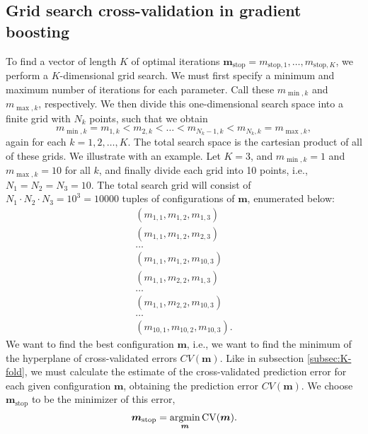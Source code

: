 \subsection{Grid search cross-validation in gradient boosting}\label{grid-search}
To find a vector of length $K$ of optimal iterations $\boldsymbol{m}_{\text{stop}}=m_{\text{stop},1},\ldots,m_{\text{stop},K}$, we perform a $K$-dimensional grid search.
We must first specify a minimum and maximum number of iterations for each parameter.
Call these $m_{\min,k}$ and $m_{\max,k}$, respectively.
We then divide this one-dimensional search space into a finite grid with $N_k$ points, such that we obtain
\begin{equation*} 
    m_{\min,k}=m_{1,k}<m_{2,k}<\ldots<m_{N_k-1,k}<m_{N_k,k}=m_{\max,k},
\end{equation*}
again for each $k=1,2,\ldots,K$.
The total search space is the cartesian product of all of these grids.
We illustrate with an example. Let $K=3$, and $m_{\min,k}=1$ and $m_{\max,k}=10$ for all $k$, and finally divide each grid into 10 points, i.e., $N_1=N_2=N_3=10$.
The total search grid will consist of $N_1\cdot N_2\cdot N_3=10^3=10000$ tuples of configurations of $\boldsymbol{m}$, enumerated below:
\begin{align*}
    \left(m_{1,1},m_{1,2},m_{1,3}\right) \\
    \left(m_{1,1},m_{1,2},m_{2,3}\right) \\
    \ldots \\
    \left(m_{1,1},m_{1,2},m_{10,3}\right) \\
    \left(m_{1,1},m_{2,2},m_{1,3}\right) \\
    \ldots \\
    \left(m_{1,1},m_{2,2},m_{10,3}\right) \\
    \ldots \\
    \left(m_{10,1},m_{10,2},m_{10,3}\right).
\end{align*}
We want to find the best configuration $\boldsymbol{m}$, i.e., we want to find the minimum of the hyperplane of cross-validated errors $CV(\boldsymbol{m})$.
Like in subsection \ref{subsec:K-fold}, we must calculate the estimate of the cross-validated prediction error for each given configuration $\boldsymbol{m}$, obtaining the prediction error $CV(\boldsymbol{m})$.
We choose $\boldsymbol{m}_{\text{stop}}$ to be the minimizer of this error,
\begin{equation*}
    \boldsymbol{m}_{\text{stop}}=\operatorname*{argmin}_{\boldsymbol{m}}\operatorname{CV}(\boldsymbol{m}).
\end{equation*}
